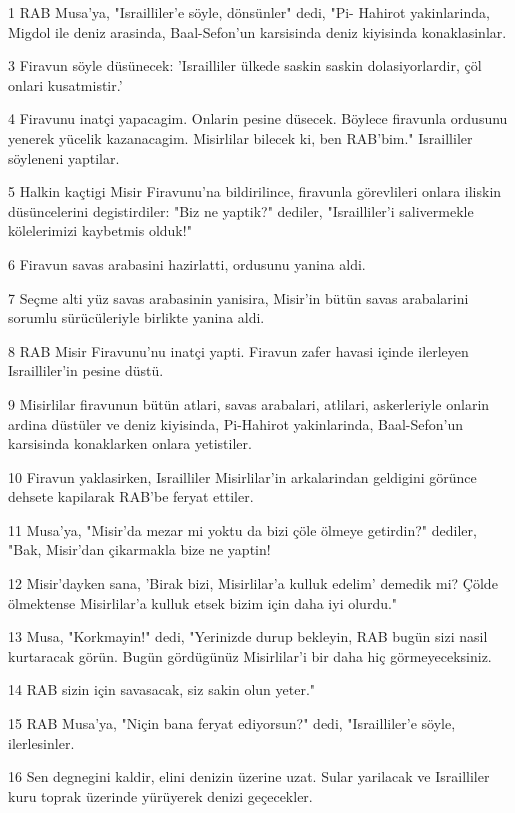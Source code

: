 \par 1 RAB Musa'ya, "Israilliler'e söyle, dönsünler" dedi, "Pi- Hahirot yakinlarinda, Migdol ile deniz arasinda, Baal-Sefon'un karsisinda deniz kiyisinda konaklasinlar.
\par 3 Firavun söyle düsünecek: 'Israilliler ülkede saskin saskin dolasiyorlardir, çöl onlari kusatmistir.'
\par 4 Firavunu inatçi yapacagim. Onlarin pesine düsecek. Böylece firavunla ordusunu yenerek yücelik kazanacagim. Misirlilar bilecek ki, ben RAB'bim." Israilliler söyleneni yaptilar.
\par 5 Halkin kaçtigi Misir Firavunu'na bildirilince, firavunla görevlileri onlara iliskin düsüncelerini degistirdiler: "Biz ne yaptik?" dediler, "Israilliler'i salivermekle kölelerimizi kaybetmis olduk!"
\par 6 Firavun savas arabasini hazirlatti, ordusunu yanina aldi.
\par 7 Seçme alti yüz savas arabasinin yanisira, Misir'in bütün savas arabalarini sorumlu sürücüleriyle birlikte yanina aldi.
\par 8 RAB Misir Firavunu'nu inatçi yapti. Firavun zafer havasi içinde ilerleyen Israilliler'in pesine düstü.
\par 9 Misirlilar firavunun bütün atlari, savas arabalari, atlilari, askerleriyle onlarin ardina düstüler ve deniz kiyisinda, Pi-Hahirot yakinlarinda, Baal-Sefon'un karsisinda konaklarken onlara yetistiler.
\par 10 Firavun yaklasirken, Israilliler Misirlilar'in arkalarindan geldigini görünce dehsete kapilarak RAB'be feryat ettiler.
\par 11 Musa'ya, "Misir'da mezar mi yoktu da bizi çöle ölmeye getirdin?" dediler, "Bak, Misir'dan çikarmakla bize ne yaptin!
\par 12 Misir'dayken sana, 'Birak bizi, Misirlilar'a kulluk edelim' demedik mi? Çölde ölmektense Misirlilar'a kulluk etsek bizim için daha iyi olurdu."
\par 13 Musa, "Korkmayin!" dedi, "Yerinizde durup bekleyin, RAB bugün sizi nasil kurtaracak görün. Bugün gördügünüz Misirlilar'i bir daha hiç görmeyeceksiniz.
\par 14 RAB sizin için savasacak, siz sakin olun yeter."
\par 15 RAB Musa'ya, "Niçin bana feryat ediyorsun?" dedi, "Israilliler'e söyle, ilerlesinler.
\par 16 Sen degnegini kaldir, elini denizin üzerine uzat. Sular yarilacak ve Israilliler kuru toprak üzerinde yürüyerek denizi geçecekler.
